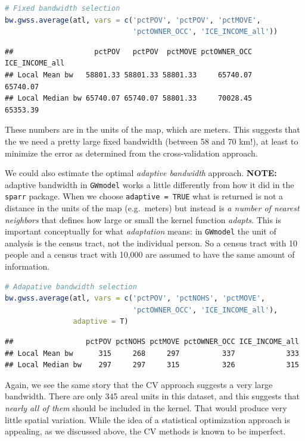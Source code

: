 \documentclass[
]{book}
\newcommand{\passthrough}[1]{#1}
\begin{document}
\begin{lstlisting}[language=R]
# Fixed bandwidth selection
bw.gwss.average(atl, vars = c('pctPOV', 'pctPOV', 'pctMOVE', 
                              'pctOWNER_OCC', 'ICE_INCOME_all'))
\end{lstlisting}

\begin{lstlisting}
##                   pctPOV   pctPOV  pctMOVE pctOWNER_OCC ICE_INCOME_all
## Local Mean bw   58801.33 58801.33 58801.33     65740.07       65740.07
## Local Median bw 65740.07 65740.07 58801.33     70028.45       65353.39
\end{lstlisting}

These numbers are in the units of the map, which are meters. This suggests that the we need a pretty large fixed bandwidth (between 58 and 70 km!), at least to minimize the error as determined from the cross-validation approach.

We could also estimate the optimal \emph{adaptive bandwidth} approach. \textbf{NOTE:} adaptive bandwidth in \passthrough{\lstinline!GWmodel!} works a little differently from how it did in the \passthrough{\lstinline!sparr!} package. When we choose \passthrough{\lstinline!adaptive = TRUE!} what is returned is not a distance in the units of the map (e.g.~meters) but instead is \emph{a number of nearest neighbors} that defines how large or small the kernel function \emph{adapts}. This is important conceptually for what \emph{adaptation} means: in \passthrough{\lstinline!GWmodel!} the unit of analysis is the census tract, not the individual person. So a census tract with 10 people and a census tract with 10,000 are assumed to have the same amount of information.

\begin{lstlisting}[language=R]
# Adapative bandwidth selection
bw.gwss.average(atl, vars = c('pctPOV', 'pctNOHS', 'pctMOVE', 
                              'pctOWNER_OCC', 'ICE_INCOME_all'),
                adaptive = T)
\end{lstlisting}

\begin{lstlisting}
##                 pctPOV pctNOHS pctMOVE pctOWNER_OCC ICE_INCOME_all
## Local Mean bw      315     268     297          337            333
## Local Median bw    297     297     315          326            315
\end{lstlisting}

Again, we see the same story that the CV approach suggests a very large bandwidth. There are only 345 areal units in this dataset, and this suggests that \emph{nearly all of them} should be included in the kernel. That would produce very little spatial variation. While the idea of a statistical optimization approach is appealing, as we discussed above, the CV methods is known to be imperfect.
\end{document}
